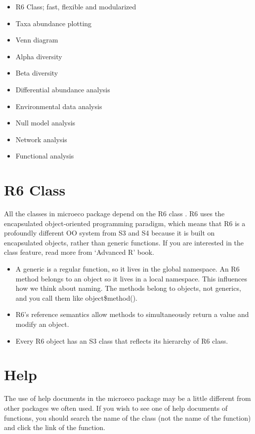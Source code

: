 \documentclass[
]{book}
\providecommand{\tightlist}{%
  \setlength{\itemsep}{0pt}\setlength{\parskip}{0pt}}
\begin{document}
\begin{itemize}
\tightlist
\item
  R6 Class; fast, flexible and modularized
\item
  Taxa abundance plotting
\item
  Venn diagram
\item
  Alpha diversity
\item
  Beta diversity
\item
  Differential abundance analysis
\item
  Environmental data analysis
\item
  Null model analysis
\item
  Network analysis
\item
  Functional analysis
\end{itemize}

\hypertarget{r6-class}{%
\section{R6 Class}\label{r6-class}}

All the classes in microeco package depend on the R6 class \citep{R6_Winston}.
R6 uses the encapsulated object-oriented programming paradigm,
which means that R6 is a profoundly different OO system from S3 and S4 because it is built on encapsulated objects, rather than generic functions.
If you are interested in the class feature, read more from `Advanced R' book.

\begin{itemize}
\item
  A generic is a regular function, so it lives in the global namespace. An R6 method belongs to an object so it lives in a local namespace.
  This influences how we think about naming. The methods belong to objects, not generics, and you call them like object\$method().
\item
  R6's reference semantics allow methods to simultaneously return a value and modify an object.
\item
  Every R6 object has an S3 class that reflects its hierarchy of R6 class.
\end{itemize}

\hypertarget{help}{%
\section{Help}\label{help}}

The use of help documents in the microeco package may be a little different from other packages we often used.
If you wish to see one of help documents of functions, you should search the name of the class (not the name of the function)
and click the link of the function.
\end{document}
